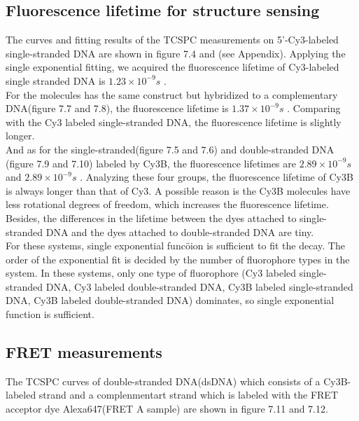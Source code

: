\documentclass[a4paper,english,12pt,bibliography=totoc]{scrreprt}
\begin{document}
\subsection{Fluorescence lifetime for structure sensing}
The curves and fitting results of the TCSPC measurements on 5'-Cy3-labeled single-stranded DNA are shown in figure 7.4 and (see Appendix). Applying the single exponential fitting, we acquired the fluorescence lifetime of Cy3-labeled single stranded DNA is $1.23 \times 10^{-9}s$ %
.\\

For the molecules has the same construct but hybridized to a complementary DNA(figure 7.7 and 7.8), the fluorescence lifetime is $1.37 \times 10^{-9}s$ %
. Comparing with the Cy3 labeled single-stranded DNA, the fluorescence lifetime is slightly longer.\\

And as for the single-stranded(figure 7.5 and 7.6) and double-stranded DNA (figure 7.9 and 7.10) labeled by Cy3B, the fluorescence lifetimes are $2.89 \times 10^{-9}s$ %
and $2.89 \times 10^{-9}s$ %
.  Analyzing these four groups, the fluorescence lifetime of Cy3B is always longer than that of Cy3. A possible reason is the Cy3B molecules have less rotational degrees of freedom, which increases the fluorescence lifetime. Besides, the differences in the lifetime between the dyes attached to single-stranded DNA and the dyes attached to double-stranded DNA are tiny.\\

For these systems, single exponential funcöion is sufficient to fit the decay. The order of the exponential fit is decided by the number of fluorophore types in the system. In these systems, only one type of fluorophore (Cy3 labeled single-stranded DNA, Cy3 labeled double-stranded DNA, Cy3B labeled single-stranded DNA, Cy3B labeled double-stranded DNA) dominates, so single exponential function is sufficient.

\subsection{FRET measurements}

The TCSPC curves of double-stranded DNA(dsDNA) which consists of a Cy3B-labeled strand and a complenmentart strand which is labeled with the FRET acceptor dye Alexa647(FRET A sample) are shown in figure 7.11 and 7.12.\\
\end{document}

